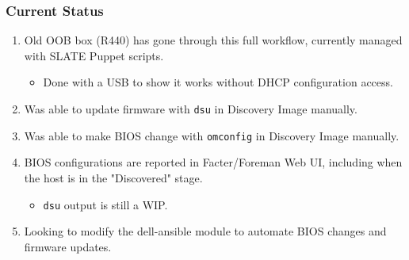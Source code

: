 \documentclass{beamer}
\begin{document}
\begin{frame}
	\frametitle{Current Status}
	\begin{enumerate}
		\item Old OOB box (R440) has gone through this full workflow, currently managed with SLATE Puppet scripts.
		      \begin{itemize}
			      \item Done with a USB to show it works without DHCP configuration access.
		      \end{itemize}
		\item Was able to update firmware with \texttt{dsu} in Discovery Image manually.
		\item Was able to make BIOS change with \texttt{omconfig} in Discovery Image manually.
		\item BIOS configurations are reported in Facter/Foreman Web UI, including when the host is in the "Discovered" stage.
		      \begin{itemize}
			      \item \texttt{dsu} output is still a WIP.
		      \end{itemize}
		\item Looking to modify the dell-ansible module to automate BIOS changes and firmware updates.
	\end{enumerate}

\end{frame}
\end{document}
